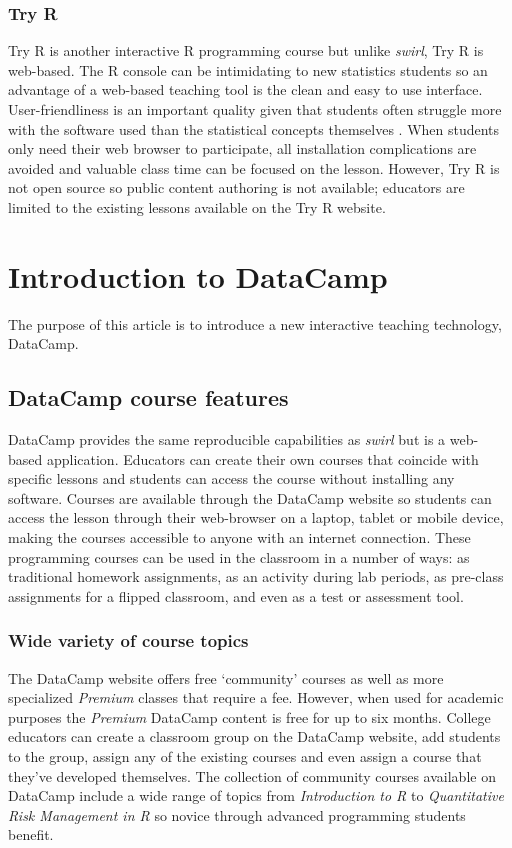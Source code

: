 \documentclass[12pt]{article}\usepackage[]{graphicx}\usepackage[]{color}
\begin{document}
\subsubsection{Try R}
Try R \citep{TryR} is another interactive R programming course but unlike \textit{swirl}, Try R is web-based. 
The R console can be intimidating to
new statistics students so an advantage of a web-based teaching tool is
the clean and easy to use interface. User-friendliness is an important quality given that students often struggle more with the
software used than the statistical concepts themselves \citep{Hare2017}. When students only need their web browser to participate,
all installation complications are avoided and valuable class time can be focused on the lesson.
However, Try R is not open source so public content authoring
is not available; educators are limited to the existing lessons available on the Try R website. 

\section{Introduction to DataCamp}

The purpose of this article is to introduce a new interactive teaching technology, DataCamp.

\subsection{DataCamp course features}

DataCamp provides the same reproducible capabilities as \textit{swirl} but is a web-based application. Educators can
create their own courses that coincide with specific lessons and students can access the course without installing any software.
Courses are available through the DataCamp website so students can access the lesson through their web-browser on a laptop,
tablet or mobile device, making the courses accessible to anyone with an internet connection. These programming courses can be used in the 
classroom in a number of ways: as traditional homework assignments, as an activity during lab periods, as pre-class assignments
for a flipped classroom, and even as a test or assessment tool.


\subsubsection{Wide variety of course topics}
The DataCamp website offers free `community' courses as well as more specialized \textit{Premium} classes that require a fee. 
However, when used for academic purposes the \textit{Premium} DataCamp content is free for up to six months.
College educators can create a classroom group on the DataCamp website, add students to the group, 
assign any of the existing courses and even assign a course that they've developed themselves. 
The collection of community courses available on DataCamp include a wide range of topics from \textit{Introduction to R} to
\textit{Quantitative Risk Management in R} so novice through advanced programming students benefit.
\end{document}
